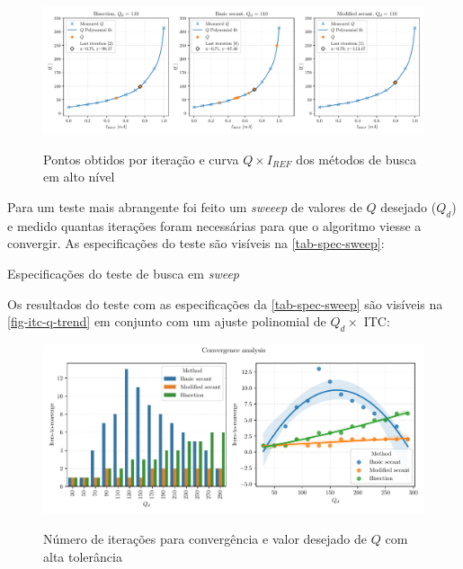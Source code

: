 \begin{figure}[H]
    \centering
    \caption{Pontos obtidos por iteração e curva $Q \times I_{REF}$ dos métodos de busca em alto nível}
    \includegraphics{fig/res-methods-single.pdf}
    \label{f-res-single}
\end{figure}


Para um teste mais abrangente foi feito um  \textit{sweeep} de valores de $Q$ desejado ($Q_d$) e medido quantas iterações foram necessárias para que o algoritmo viesse a convergir. As especificações do teste são visíveis na \autoref{tab-spec-sweep}: 

\begin{table}[H]
    \centering
    \caption{Especificações do teste de busca em \textit{sweep}}
    
    \label{tab-spec-sweep}
\end{table}

Os resultados do teste com as especificações da \autoref{tab-spec-sweep} são visíveis na \autoref{fig-itc-q-trend} em conjunto com um ajuste polinomial de $Q_d \times$ ITC:

\begin{figure}[H]
    \centering
    \caption{Número de iterações para convergência e valor desejado de $Q$ com alta tolerância}
    \includegraphics{fig/conv-analysis-no-drop.pdf}
    \label{fig-itc-q-trend}
\end{figure}

